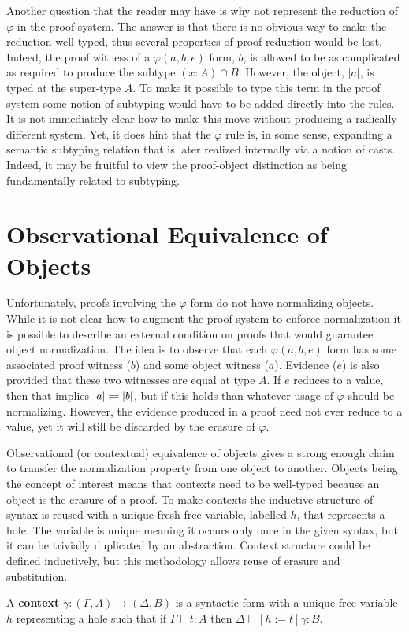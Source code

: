 Another question that the reader may have is why not represent the reduction of $\varphi$ in the proof system.
The answer is that there is no obvious way to make the reduction well-typed, thus several properties of proof reduction would be lost.
Indeed, the proof witness of a $\varphi(a, b, e)$ form, $b$, is allowed to be as complicated as required to produce the subtype $(x : A) \cap B$.
However, the object, $|a|$, is typed at the super-type $A$.
To make it possible to type this term in the proof system some notion of subtyping would have to be added directly into the rules.
It is not immediately clear how to make this move without producing a radically different system.
Yet, it does hint that the $\varphi$ rule is, in some sense, expanding a semantic subtyping relation that is later realized internally via a notion of casts.
Indeed, it may be fruitful to view the proof-object distinction as being fundamentally related to subtyping.

\section{Observational Equivalence of Objects}

Unfortunately, proofs involving the $\varphi$ form do not have normalizing objects.
While it is not clear how to augment the proof system to enforce normalization it is possible to describe an external condition on proofs that would guarantee object normalization.
The idea is to observe that each $\varphi(a, b, e)$ form has some associated proof witness ($b$) and some object witness ($a$).
Evidence ($e$) is also provided that these two witnesses are equal at type $A$.
If $e$ reduces to a value, then that implies $|a| \rightleftharpoons |b|$, but if this holds than whatever usage of $\varphi$ should be normalizing.
However, the evidence produced in a proof need not ever reduce to a value, yet it will still be discarded by the erasure of $\varphi$.

Observational (or contextual) equivalence of objects gives a strong enough claim to transfer the normalization property from one object to another.
Objects being the concept of interest means that contexts need to be well-typed because an object is the erasure of a proof.
To make contexts the inductive structure of syntax is reused with a unique fresh free variable, labelled $h$, that represents a hole.
The variable is unique meaning it occurs only once in the given syntax, but it can be trivially duplicated by an abstraction.
Context structure could be defined inductively, but this methodology allows reuse of erasure and substitution.
\begin{definition}
    A \textbf{context} $\gamma : (\Gamma, A) \to (\Delta, B)$ is a syntactic form with a unique free variable $h$ representing a hole such that if $\Gamma \vdash t : A$ then $\Delta \vdash [h := t]\gamma : B$.
\end{definition}

